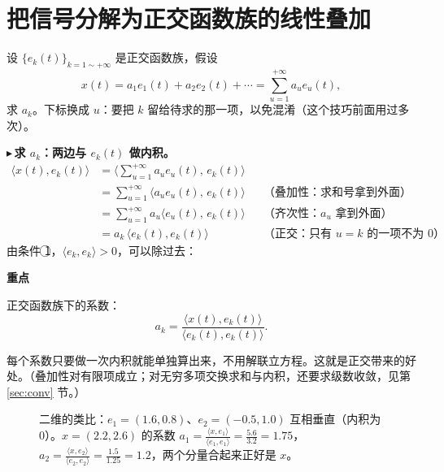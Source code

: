 \documentclass[UTF8,a4paper,11pt]{ctexart}
\newenvironment{remember}{\begin{rememberbox}\textbf{重点}\par\smallskip}{\end{rememberbox}}
\newcounter{ex}[section]
\newcommand{\point}[1]{\par\addvspace{1ex}\noindent\textcolor{ptteal}{$\blacktriangleright$\,\textbf{#1}}\ }
\begin{document}
\section{把信号分解为正交函数族的线性叠加}\label{sec:dec}
设 $\{e_k(t)\}_{k=1\sim+\infty}$ 是正交函数族，假设
\[
x(t)=a_1e_1(t)+a_2e_2(t)+\cdots=\sum_{u=1}^{+\infty}a_ue_u(t),
\]
求 $a_k$。下标换成 $u$：要把 $k$ 留给待求的那一项，以免混淆（这个技巧前面用过多次）。

\point{求 $a_k$：两边与 $e_k(t)$ 做内积。}
\begin{align*}
\langle x(t),e_k(t)\rangle
&=\Big\langle\sum_{u=1}^{+\infty}a_ue_u(t),\,e_k(t)\Big\rangle\\
&=\sum_{u=1}^{+\infty}\big\langle a_ue_u(t),\,e_k(t)\big\rangle&&\text{（叠加性：求和号拿到外面）}\\
&=\sum_{u=1}^{+\infty}a_u\big\langle e_u(t),\,e_k(t)\big\rangle&&\text{（齐次性：$a_u$ 拿到外面）}\\
&=a_k\,\langle e_k(t),e_k(t)\rangle&&\text{（正交：只有 $u=k$ 的一项不为 $0$）}.
\end{align*}
由条件 \textcircled{\scriptsize 1}，$\langle e_k,e_k\rangle>0$，可以除过去：
\begin{remember}
正交函数族下的系数：
\[
a_k=\frac{\langle x(t),e_k(t)\rangle}{\langle e_k(t),e_k(t)\rangle}.
\]
\end{remember}
每个系数只要做一次内积就能单独算出来，不用解联立方程。这就是正交带来的好处。（叠加性对有限项成立；对无穷多项交换求和与内积，还要求级数收敛，见第 \ref{sec:conv} 节。）

\begin{figure}[H]
\centering
{}
\caption{二维的类比：$e_1=(1.6,0.8)$、$e_2=(-0.5,1.0)$ 互相垂直（内积为 $0$）。$x=(2.2,2.6)$ 的系数 $a_1=\frac{\langle x,e_1\rangle}{\langle e_1,e_1\rangle}=\frac{5.6}{3.2}=1.75$，$a_2=\frac{\langle x,e_2\rangle}{\langle e_2,e_2\rangle}=\frac{1.5}{1.25}=1.2$，两个分量合起来正好是 $x$。}
\end{figure}
\end{document}
